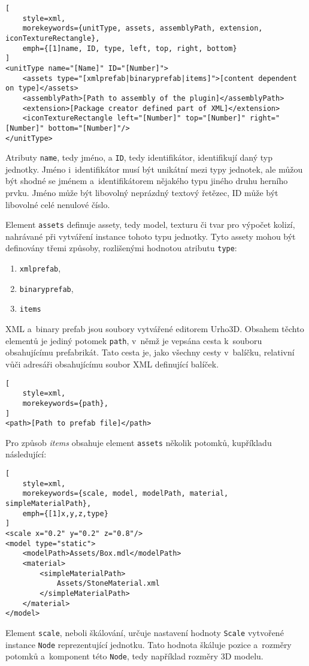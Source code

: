 \begin{lstlisting}[
	style=xml,
	morekeywords={unitType, assets, assemblyPath, extension, iconTextureRectangle},
	emph={[1]name, ID, type, left, top, right, bottom}
]
<unitType name="[Name]" ID="[Number]">
	<assets type="[xmlprefab|binaryprefab|items]">[content dependent on type]</assets>
	<assemblyPath>[Path to assembly of the plugin]</assemblyPath>
	<extension>[Package creator defined part of XML]</extension>
	<iconTextureRectangle left="[Number]" top="[Number]" right="[Number]" bottom="[Number]"/>
</unitType>
\end{lstlisting}

Atributy \texttt{name}, tedy jméno, a \texttt{ID}, tedy identifikátor, identifikují daný typ jednotky. Jméno i~identifikátor musí být unikátní mezi typy jednotek, ale můžou být shodné se jménem a~identifikátorem nějakého typu jiného druhu herního prvku. Jméno může být libovolný neprázdný textový řetězec, ID může být libovolné celé nenulové číslo.

Element \texttt{assets} definuje assety, tedy model, texturu či tvar pro výpočet kolizí, nahrávané při vytváření instance tohoto typu jednotky. Tyto assety mohou být definovány třemi způsoby, rozlišenými hodnotou atributu \texttt{type}:

\begin{enumerate}
	\item \texttt{xmlprefab},
	\item \texttt{binaryprefab},
	\item \texttt{items}
\end{enumerate}

XML a~binary prefab jsou soubory vytvářené editorem Urho3D. Obsahem těchto elementů je jediný potomek \texttt{path}, v~němž je vepsána cesta k~souboru obsahujícímu prefabrikát. Tato cesta je, jako všechny cesty v~balíčku, relativní vůči adresáři obsahujícímu soubor XML definující balíček.

\begin{lstlisting}[
	style=xml,
	morekeywords={path},
]
<path>[Path to prefab file]</path>
\end{lstlisting}

Pro způsob \textit{items} obsahuje element \texttt{assets} několik potomků, kupříkladu následující:

\begin{lstlisting}[
	style=xml,
	morekeywords={scale, model, modelPath, material, simpleMaterialPath},
	emph={[1]x,y,z,type}
]
<scale x="0.2" y="0.2" z="0.8"/>
<model type="static">
	<modelPath>Assets/Box.mdl</modelPath>
	<material>
		<simpleMaterialPath>
			Assets/StoneMaterial.xml
		</simpleMaterialPath>
	</material>
</model>
\end{lstlisting}
Element \texttt{scale}, neboli škálování, určuje nastavení hodnoty \texttt{Scale} vytvořené instance \texttt{Node} reprezentující jednotku. Tato hodnota škáluje pozice a~rozměry potomků a~komponent této \texttt{Node}, tedy například rozměry 3D modelu. 


